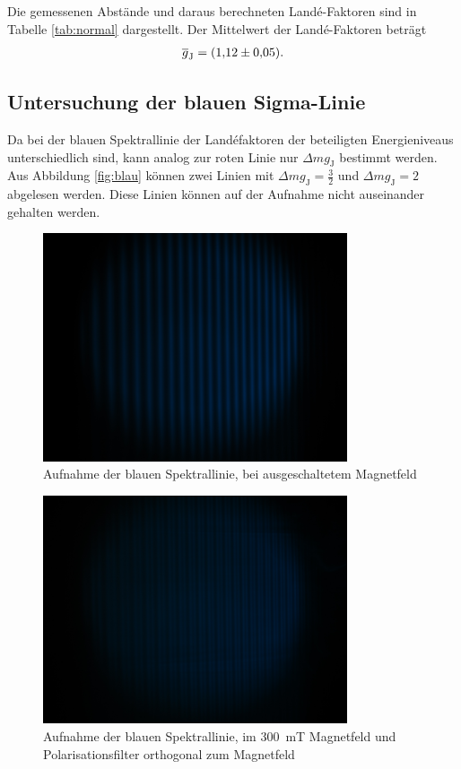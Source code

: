 Die gemessenen Abstände und daraus berechneten Landé-Faktoren sind in Tabelle \ref{tab:normal} dargestellt.
Der Mittelwert der Landé-Faktoren beträgt
\begin{align}
	\overline{g}_\text{J} = \SI{1.12 \pm 0.05}{}.
\end{align}

\subsection{Untersuchung der blauen Sigma-Linie}

Da bei der blauen Spektrallinie der Landéfaktoren der beteiligten Energieniveaus unterschiedlich sind, kann analog zur roten Linie nur $\Delta m g_\text{J}$ bestimmt werden.
Aus Abbildung \ref{fig:blau} können zwei Linien mit $\Delta m g_\text{J} = \frac{3}{2}$ und $\Delta m g_\text{J} = 2$ abgelesen werden.
Diese Linien können auf der Aufnahme nicht auseinander gehalten werden.
\begin{figure}
	\centering
	\includegraphics[width=0.8\textwidth]{img/blau-0A.JPG}
	\caption{Aufnahme der blauen Spektrallinie, bei ausgeschaltetem Magnetfeld}
	\label{fig:blau1}
\end{figure}
\begin{figure}
	\centering
	\includegraphics[width=0.8\textwidth]{img/blau-5A-ortho.JPG}
	\caption{Aufnahme der blauen Spektrallinie, im \SI{300}{\milli \tesla} Magnetfeld und Polarisationsfilter orthogonal zum Magnetfeld}
	\label{fig:blau2}
\end{figure}
